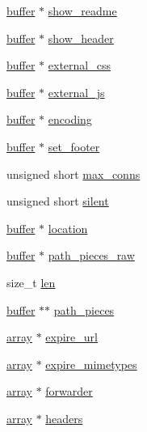\begin{DoxyCompactItemize}
\item 
\hyperlink{structbuffer}{buffer} $\ast$ \hyperlink{structplugin__config_ae40e447885946652ab184de8ddf192da}{show\-\_\-readme}
\item 
\hyperlink{structbuffer}{buffer} $\ast$ \hyperlink{structplugin__config_a972e1e36aeb701d39f42c7cae086e85e}{show\-\_\-header}
\item 
\hyperlink{structbuffer}{buffer} $\ast$ \hyperlink{structplugin__config_a0de3019ee9404f690458f15c08d8f790}{external\-\_\-css}
\item 
\hyperlink{structbuffer}{buffer} $\ast$ \hyperlink{structplugin__config_a1ebcf64863e68185ff0a19e199b9a6b5}{external\-\_\-js}
\item 
\hyperlink{structbuffer}{buffer} $\ast$ \hyperlink{structplugin__config_a0f9e219aa12e75027ecec74bfccebdb5}{encoding}
\item 
\hyperlink{structbuffer}{buffer} $\ast$ \hyperlink{structplugin__config_a6051c6eccfe87465909ddc25490d5311}{set\-\_\-footer}
\item 
unsigned short \hyperlink{structplugin__config_ae594c7b02113f968a3f54ed5eac7d450}{max\-\_\-conns}
\item 
unsigned short \hyperlink{structplugin__config_a708b5822420979a10ef1321c5aba9e45}{silent}
\item 
\hyperlink{structbuffer}{buffer} $\ast$ \hyperlink{structplugin__config_af3b49b07eec2b3e97c1bf62438f09420}{location}
\item 
\hyperlink{structbuffer}{buffer} $\ast$ \hyperlink{structplugin__config_aec0e007f1d17359a43373ec7103255a5}{path\-\_\-pieces\-\_\-raw}
\item 
size\-\_\-t \hyperlink{structplugin__config_a99f095cf4d13dc80a2f684ef20b4195d}{len}
\item 
\hyperlink{structbuffer}{buffer} $\ast$$\ast$ \hyperlink{structplugin__config_ad893918703f5468a3237aed674073194}{path\-\_\-pieces}
\item 
\hyperlink{structarray}{array} $\ast$ \hyperlink{structplugin__config_a22279a8ba759ef86b05dfe068e312f02}{expire\-\_\-url}
\item 
\hyperlink{structarray}{array} $\ast$ \hyperlink{structplugin__config_a12c31c882ac5dec68e94c7e6926c9587}{expire\-\_\-mimetypes}
\item 
\hyperlink{structarray}{array} $\ast$ \hyperlink{structplugin__config_a56c04edf2b12ab4b825c28746cd54a5f}{forwarder}
\item 
\hyperlink{structarray}{array} $\ast$ \hyperlink{structplugin__config_a127bbf4bc25a23462d021449a6349c6d}{headers}
$$
\end{DoxyCompactItemize}

